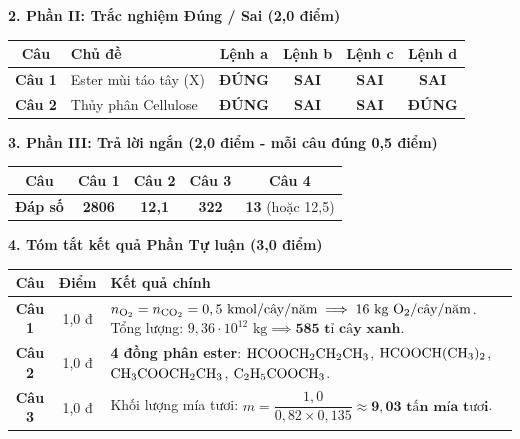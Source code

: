 \documentclass[11pt,a4paper]{article}
\begin{document}
\vspace{2pt}
\noindent
\textbf{\color{mainGreen}2. Phần II: Trắc nghiệm Đúng / Sai (2,0 điểm)}
\begin{center}
\renewcommand{\arraystretch}{1.2}
\begin{tabular}{|c|l|c|c|c|c|}
\hline
\rowcolor{tableGreen}
\textbf{Câu} & \textbf{Chủ đề} & \textbf{Lệnh a} & \textbf{Lệnh b} & \textbf{Lệnh c} & \textbf{Lệnh d} \\
\hline
\textbf{Câu 1} & Ester mùi táo tây (X) & \textbf{\color{hfRed}ĐÚNG} & \textbf{SAI} & \textbf{SAI} & \textbf{SAI} \\
\hline
\textbf{Câu 2} & Thủy phân Cellulose & \textbf{\color{hfRed}ĐÚNG} & \textbf{SAI} & \textbf{SAI} & \textbf{\color{hfRed}ĐÚNG} \\
\hline
\end{tabular}
\end{center}

\vspace{2pt}
\noindent
\textbf{\color{mainGreen}3. Phần III: Trả lời ngắn (2,0 điểm - mỗi câu đúng 0,5 điểm)}
\begin{center}
\renewcommand{\arraystretch}{1.2}
\begin{tabular}{|c|c|c|c|c|}
\hline
\rowcolor{tableGreen}
\textbf{Câu} & \textbf{Câu 1} & \textbf{Câu 2} & \textbf{Câu 3} & \textbf{Câu 4} \\
\hline
\textbf{Đáp số} & \textbf{\color{hfRed}2806} & \textbf{\color{hfRed}12,1} & \textbf{\color{hfRed}322} & \textbf{\color{hfRed}13} (hoặc 12,5) \\
\hline
\end{tabular}
\end{center}

\vspace{2pt}
\noindent
\textbf{\color{mainGreen}4. Tóm tắt kết quả Phần Tự luận (3,0 điểm)}
\begin{center}
\renewcommand{\arraystretch}{1.2}
\begin{tabular}{|c|c|p{11.5cm}|}
\hline
\rowcolor{tableGreen}
\textbf{Câu} & \textbf{Điểm} & \textbf{Kết quả chính} \\
\hline
\textbf{Câu 1} & 1,0 đ & $n_{\ce{O2}} = n_{\ce{CO2}} = 0,5\text{ kmol/cây/năm} \implies 16\text{ kg \ce{O2}/cây/năm}$. Tổng lượng: $9,36\cdot 10^{12}\text{ kg} \implies \mathbf{585\text{ tỉ cây xanh}}$. \\
\hline
\textbf{Câu 2} & 1,0 đ & \textbf{4 đồng phân ester}: $\ce{HCOOCH2CH2CH3}$, $\ce{HCOOCH(CH3)2}$, $\ce{CH3COOCH2CH3}$, $\ce{C2H5COOCH3}$. \\
\hline
\textbf{Câu 3} & 1,0 đ & Khối lượng mía tươi: $m = \dfrac{1,0}{0,82 \times 0,135} \approx \mathbf{9,03\text{ tấn mía tươi}}$. \\
\hline
\end{tabular}
\end{center}
\end{document}
